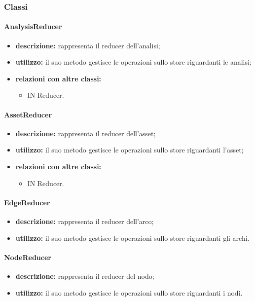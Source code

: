 \subsubsection{Classi}
\paragraph{AnalysisReducer}
\begin{itemize}
	\item \textbf{descrizione:} rappresenta il reducer dell'analisi;
	\item \textbf{utilizzo:} il suo metodo gestisce le operazioni sullo store riguardanti le analisi;
	\item \textbf{relazioni con altre classi:} 
	\begin{itemize}
		\item IN Reducer.
	\end{itemize}
\end{itemize}
\paragraph{AssetReducer}
\begin{itemize}
	\item \textbf{descrizione:} rappresenta il reducer dell'asset;
	\item \textbf{utilizzo:} il suo metodo gestisce le operazioni sullo store riguardanti l'asset;
	\item \textbf{relazioni con altre classi:} 
	\begin{itemize}
		\item IN Reducer.
	\end{itemize}
\end{itemize}
\paragraph{EdgeReducer}
\begin{itemize}
	\item \textbf{descrizione:} rappresenta il reducer dell'arco;
	\item \textbf{utilizzo:} il suo metodo gestisce le operazioni sullo store riguardanti gli archi.
\end{itemize}
\paragraph{NodeReducer}
\begin{itemize}
	\item \textbf{descrizione:} rappresenta il reducer del nodo;
	\item \textbf{utilizzo:} il suo metodo gestisce le operazioni sullo store riguardanti i nodi.
\end{itemize}
